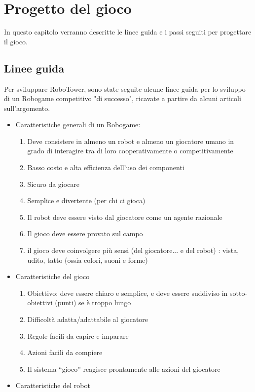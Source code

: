 \chapter{Progetto del gioco}
\label{cap:progetto}

In questo capitolo verranno descritte le linee guida e i passi seguiti per progettare il gioco.

\section{Linee guida}
Per sviluppare RoboTower, sono state seguite alcune linee guida per lo sviluppo di un Robogame competitivo "di successo", ricavate a partire da alcuni articoli sull'argomento. 
\begin{itemize}
\item Caratteristiche generali di un Robogame:
\begin{enumerate}
\item Deve consistere in almeno un robot e almeno un giocatore umano in grado di interagire tra di loro cooperativamente o competitivamente
\item Basso costo e alta efficienza dell’uso dei componenti
\item Sicuro da giocare
\item Semplice e divertente (per chi ci gioca)
\item Il robot deve essere visto dal giocatore come un agente razionale
\item Il gioco deve essere provato sul campo
\item il gioco deve coinvolgere più sensi (del giocatore... e del robot) : vista, udito, tatto (ossia colori, suoni e forme)
\end{enumerate}
\item Caratteristiche del gioco
\begin{enumerate}
\item Obiettivo: deve essere chiaro e semplice, e deve essere suddiviso in sotto-obiettivi (punti) se è troppo lungo
\item Difficoltà adatta/adattabile al giocatore
\item Regole facili da capire e imparare
\item Azioni facili da compiere
\item Il sistema “gioco” reagisce prontamente alle azioni del giocatore
\end{enumerate}
\item Caratteristiche del robot

\end{itemize}
